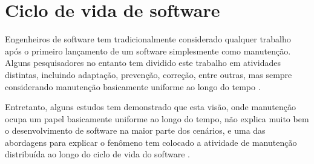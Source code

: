 \section{Ciclo de vida de software}

Engenheiros de software tem tradicionalmente considerado qualquer trabalho após
o primeiro lançamento de um software simplesmente como manutenção. Alguns
pesquisadores no entanto tem dividido este trabalho em atividades distintas, incluindo
adaptação, prevenção, correção, entre outras, mas sempre considerando manutenção
basicamente uniforme ao longo do tempo \cite{rajlich2000staged}.

Entretanto, alguns estudos tem demonstrado que esta visão, onde manutenção
ocupa um papel basicamente uniforme ao longo do tempo, não explica muito bem o
desenvolvimento de software na maior parte dos cenários, e uma das abordagens
para explicar o fenômeno tem colocado a atividade de manutenção distribuída ao
longo do ciclo de vida do software \cite{rajlich2000staged}.

